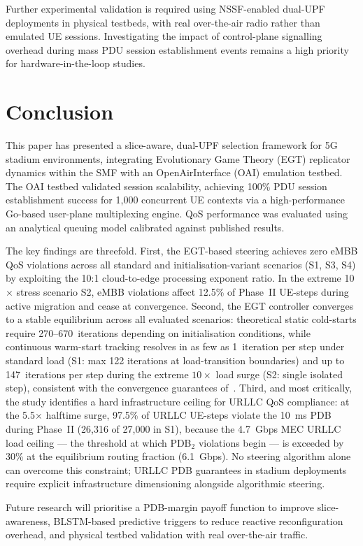 \documentclass[conference]{IEEEtran}
\begin{document}
Further experimental validation is required using
NSSF-enabled dual-UPF deployments in physical testbeds,
with real over-the-air radio rather than emulated UE
sessions. Investigating the impact of control-plane
signalling overhead during mass PDU session establishment
events remains a high priority for hardware-in-the-loop
studies.

\section{Conclusion}

This paper has presented a slice-aware, dual-UPF
selection framework for 5G stadium environments,
integrating Evolutionary Game Theory (EGT) replicator
dynamics within the SMF with an OpenAirInterface (OAI)
emulation testbed. The OAI testbed validated session
scalability, achieving 100\% PDU session establishment
success for 1,000 concurrent UE contexts via a
high-performance Go-based user-plane multiplexing engine.
QoS performance was evaluated using an analytical queuing
model calibrated against published results.

The key findings are threefold. First, the EGT-based
steering achieves zero eMBB QoS violations across all
standard and initialisation-variant scenarios (S1, S3, S4)
by exploiting the 10:1 cloud-to-edge processing exponent
ratio. In the extreme 10$\times$ stress scenario S2, eMBB
violations affect 12.5\% of Phase~II UE-steps
during active migration and cease at convergence.
Second, the EGT controller converges to a stable equilibrium across all
evaluated scenarios: theoretical static cold-starts require
270--670~iterations depending on initialisation
conditions, while continuous warm-start tracking
resolves in as few as 1~iteration per step under
standard load (S1: max 122 iterations at load-transition
boundaries) and up to 147~iterations per step during the
extreme $10\times$ load surge (S2: single isolated step),
consistent with the convergence guarantees of~\cite{Alevizaki2021upf}.
Third, and most critically, the study identifies a hard
infrastructure ceiling for URLLC QoS compliance: at the
5.5$\times$ halftime surge, 97.5\% of URLLC UE-steps
violate the 10~ms PDB during Phase~II (26,316 of 27,000
in S1), because the 4.7~Gbps MEC URLLC load ceiling ---
the threshold at which PDB$_2$ violations begin --- is
exceeded by 30\% at the equilibrium routing fraction
(6.1~Gbps). No steering algorithm alone can overcome
this constraint; URLLC PDB guarantees in stadium
deployments require explicit infrastructure
dimensioning alongside algorithmic steering.

Future research will prioritise a PDB-margin payoff
function to improve slice-awareness, BLSTM-based
predictive triggers to reduce reactive reconfiguration
overhead, and physical testbed validation with real
over-the-air traffic.



\end{document}
